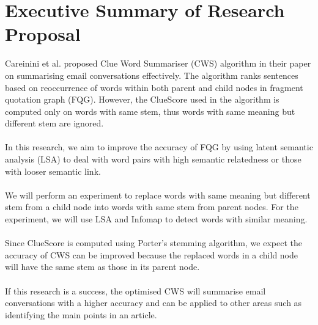 \documentclass[a4paper, 12pt]{article}
\begin{document}
\section*{Executive Summary of Research Proposal}
Careinini et al. proposed Clue Word Summariser (CWS) algorithm in their paper on summarising email conversations effectively. The algorithm ranks sentences based on reoccurrence of words within both parent and child nodes in fragment quotation graph (FQG). However, the ClueScore used in the algorithm is computed only on words with same stem, thus words with same meaning but different stem are ignored.
\\ \\
In this research, we aim to improve the accuracy of FQG by using latent semantic analysis (LSA) to deal with word pairs with high semantic relatedness or those with looser semantic link.
\\ \\
We will perform an experiment to replace words with same meaning but different stem from a child node into words with same stem from parent nodes. For the experiment, we will use LSA and Infomap to detect words with similar meaning.
\\ \\
Since ClueScore is computed using Porter’s stemming algorithm, we expect the accuracy of CWS can be improved because the replaced words in a child node will have the same stem as those in its parent node.
\\ \\
If this research is a success, the optimised CWS will summarise email conversations with a higher accuracy and can be applied to other areas such as identifying the main points in an article.
\end{document}
